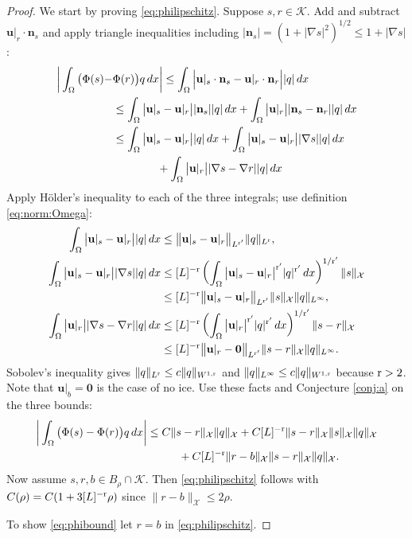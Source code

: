 \documentclass[hidelinks,onefignum,onetabnum,final]{siamart220329}  %
\newcommand{\grad}{\nabla}
\newcommand{\bn}{\mathbf{n}}
\newcommand{\bu}{\mathbf{u}}
\newcommand{\bzero}{\bm{0}}
\newcommand{\cK}{\mathcal{K}}
\newcommand{\cX}{\mathcal{X}}
\newcommand{\rr}{{\text{\textnormal{r}}}}
\begin{document}
\begin{proof}
We start by proving \eqref{eq:philipschitz}.  Suppose $s,r\in\cK$.  Add and subtract $\bu|_r \cdot \bn_s$ and apply triangle inequalities including $|\bn_s|=\left(1+|\grad s|^2\right)^{1/2} \le 1 + |\grad s|$:
\begin{align}
\bigg|\int_\Omega \big(\Phi(s) - &\Phi(r)\big) q\,dx\bigg| \le \int_\Omega \Big|\bu|_s\cdot \bn_s - \bu|_r \cdot \bn_r\Big| |q|\,dx \\
    &\le \int_\Omega \big|\bu|_s - \bu|_r\big| |\bn_s| |q|\,dx + \int_\Omega \big|\bu|_r\big| |\bn_s-\bn_r| |q|\,dx \notag \\
    &\le \int_\Omega \big|\bu|_s - \bu|_r\big| |q|\,dx + \int_\Omega \big|\bu|_s - \bu|_r\big| |\grad s| |q|\,dx \notag \\
    &\qquad\qquad + \int_\Omega \big|\bu|_r\big| |\grad s-\grad r| |q|\,dx \notag
\end{align}
Apply H\"older's inequality to each of the three integrals; use definition \eqref{eq:norm:Omega}:
\begin{align}
\int_\Omega \big|\bu|_s - \bu|_r\big| |q|\,dx &\le \big\|\bu|_s - \bu|_r\big\|_{L^{\rr'}} \|q\|_{L^{\rr}}, \\
\int_\Omega \big|\bu|_s - \bu|_r\big| |\grad s| |q|\,dx &\le [L]^{-\rr} \left(\int_\Omega \big|\bu|_s - \bu|_r\big|^{\rr'} |q|^{\rr'}\, dx\right)^{1/\rr'} \|s\|_{\cX} \\
    &\le [L]^{-\rr} \big\|\bu|_s - \bu|_r\big\|_{L^{\rr'}} \|s\|_{\cX} \|q\|_{L^\infty}, \notag \\
\int_\Omega \big|\bu|_r\big| |\grad s-\grad r| |q|\,dx &\le [L]^{-\rr} \left(\int_\Omega \big|\bu|_r\big|^{\rr'} |q|^{\rr'}\, dx\right)^{1/\rr'} \|s-r\|_{\cX} \\
    &\le [L]^{-\rr} \big\|\bu|_r - \bzero\big\|_{L^{\rr'}} \|s-r\|_{\cX} \|q\|_{L^\infty}. \notag
\end{align}
Sobolev's inequality gives $\|q\|_{L^{\rr}} \le c \|q\|_{W^{1,\rr}}$ and $\|q\|_{L^\infty} \le c \|q\|_{W^{1,\rr}}$ because $\rr>2$.  Note that $\bu|_b=\bzero$ is the case of no ice.  Use these facts and Conjecture \ref{conj:a} on the three bounds:
\begin{align}
\bigg|\int_\Omega \big(\Phi(s) - \Phi(r)\big) q\,dx\bigg| &\le C \|s-r\|_{\cX} \|q\|_{\cX} + C [L]^{-\rr} \|s-r\|_{\cX} \|s\|_{\cX} \|q\|_{\cX} \\
    &\hspace{10mm} + C [L]^{-\rr} \|r - b\|_{\cX} \|s-r\|_{\cX} \|q\|_{\cX}. \notag
\end{align}
Now assume $s,r,b\in B_\rho\cap \cK$.  Then \eqref{eq:philipschitz} follows with $C(\rho) = C (1 + 3 [L]^{-\rr} \rho)$ since $\|r - b\|_{\cX}\le 2\rho$.

To show \eqref{eq:phibound} let $r=b$ in \eqref{eq:philipschitz}.
\end{proof}
\end{document}
